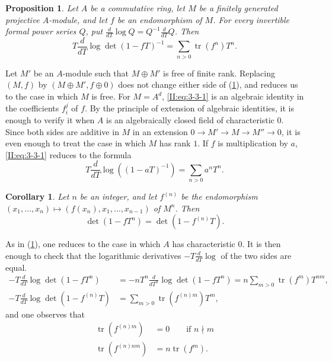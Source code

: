 \documentclass[12pt,oneside,english]{smfbook}
\DeclareMathOperator{\tr}{tr}
\newcounter{char}
\newtheorem{corollary_}[subsection]{Corollary}
\newtheorem{proposition_}[subsection]{Proposition}
\begin{document}
\begin{proposition_}\label{II:3-3}
Let $A$ be a commutative ring, let $M$ be a finitely generated projective $A$-module, and let $f$ be an endomorphism of $M$. For every invertible formal power series $Q$, put $\frac{d}{dT}\log Q=Q^{-1}\frac{d}{dT}Q$. Then
\begin{equation*}\tag{3.3.1}\label{II:eq:3-3-1}
  T\frac{d}{dT}\log\det(1-f T)^{-1} = \sum_{n>0} \tr(f^n) T^n \text{.}
\end{equation*}
\end{proposition_}

Let $M'$ be an $A$-module such that $M\oplus M'$ is free of finite rank. Replacing $(M,f)$ by $(M\oplus M',f\oplus0)$ does not change either side of (\ref{II:3-3}), and reduces us to the case in which $M$ is free. For $M=A^d$, \eqref{II:eq:3-3-1} is an algebraic identity in the coefficients $f_i^j$ of $f$. By the principle of extension of algebraic identities, it is enough to verify it when $A$ is an algebraically closed field of characteristic $0$. Since both sides are additive in $M$ in an extension $0\to M'\to M\to M''\to0$, it is even enough to treat the case in which $M$ has rank $1$. If $f$ is multiplication by $a$, \eqref{II:eq:3-3-1} reduces to the formula
\[
  T\frac{d}{dT}\log\left((1-a T)^{-1}\right) = \sum_{n>0} a^n T^n \text{.}
\]

\begin{corollary_}\label{II:3-4}
Let $n$ be an integer, and let $f^{(n)}$ be the endomorphism $(x_1,\dotsc,x_n)\mapsto \left(f(x_n),x_1,\dotsc,x_{n-1}\right)$ of $M^n$. Then
\begin{equation*}\tag{3.4.1}\label{II:eq:3-4-1}
  \det(1-f T^n) = \det(1-f^{(n)} T) \text{.}
\end{equation*}
\end{corollary_}

As in (\ref{II:3-3}), one reduces to the case in which $A$ has characteristic $0$. It is then enough to check that the logarithmic derivatives $-T\frac{d}{dT}\log$ of the two sides are equal.
\begin{align*}
  -T\frac{d}{dT}\log\det(1-f T^n) &= - n T^n \frac{d}{dT^n} \log\det(1-f T^n) = n \sum_{m>0} \tr(f^m) T^{n m} \text{,} \\
  -T \frac{d}{dT}\log\det\left(1-f^{(n)} T\right) &= \sum_{m>0} \tr\left(f^{(n) m}\right) T^m \text{,}
\end{align*}
and one observes that
\begin{align*}
  \tr(f^{(n) m}) &= 0 \qquad \text{if $n\nmid m$} \\
  \tr(f^{(n) n m}) &= n \tr(f^m) \text{.}
\end{align*}
\end{document}
